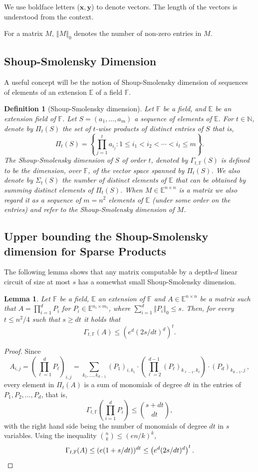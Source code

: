 \documentclass[10pt,a4paper]{article}
\newtheorem{lemma}[theorem]{Lemma}
\newtheorem{definition}[theorem]{Definition}
\newcommand{\F}{\mathbb F}
\newcommand{\E}{\mathbb E}
\newcommand{\N}{\mathbb N}
\newcommand{\vecx}{\mathbf x}
\newcommand{\vecy}{\mathbf y}
\newcommand{\inparen}[1]{\left(#1\right)}
\newcommand{\spars}[1]{\left\Vert#1\right\Vert_0}
\begin{document}
We use boldface letters ($\vecx,\vecy$) to denote vectors. The length of the vectors is understood from the context.

For a matrix $M$, $\spars{M}$ denotes the number of non-zero entries in $M$. 

\subsection{Shoup-Smolensky Dimension}
\label{sec:ssdim}
A useful concept will be the notion of Shoup-Smolensky dimension of sequences of elements of an extension $\E$ of a field $\F$. 
\begin{definition}[Shoup-Smolensky dimension]\label{def:SS-dim}
Let $\F$ be a field, and $\E$ be an extension field of $\F$. Let $S=(a_1,\ldots,a_m)$ a sequence of elements of $\E$. For $t\in\N$, denote by $\Pi_t(S)$ the set of $t$-wise products of distinct entries of $S$ that is,
\[\Pi_t(S)=\left\{\prod_{j=1}^t a_{i_j}:1\le i_1<i_2<\cdots<i_t\le m\right\}.\]
The Shoup-Smolensky dimension of $S$ of order $t$, denoted by $\Gamma_{t,\F}(S)$ is defined to be the dimension, over $\F$, of the vector space spanned by $\Pi_t(S)$.
We also denote by $\Sigma_t(S)$ the number of distinct elements of $\E$ that can be obtained by summing distinct elements of $\Pi_t(S)$.
When $M\in\E^{n\times n}$ is a matrix we also regard it as a sequence of $m=n^2$ elements of $\E$ (under some order on the entries) and refer to the Shoup-Smolensky dimension of $M$.
\end{definition}


\subsection{Upper bounding the Shoup-Smolensky dimension for Sparse Products}

\label{sec:SS-dim}
The following lemma shows that any matrix computable by a depth-$d$ linear circuit of size at most $s$ has a somewhat small Shoup-Smolensky dimension. 

\begin{lemma}\label{lem:ss-easy-ub-large-depth}
Let $\F$ be a field, $\E$ an extension of $\F$ and $A \in \E^{n \times n}$ be a matrix such that $A = \prod_{i = 1}^d P_i$ for $P_i \in \E^{n_i \times m_i}$, where $\sum_{i = 1}^d\spars{P_i} \leq s$. Then, for every $t\le n^2/4$ such that $s \ge dt$ it holds that
\[
\Gamma_{t, \F}(A) \le \inparen{e^d (2s/dt)^d}^t.
\]
\end{lemma}
\begin{proof}
Since 
$$A_{i,j} = \left(\prod_{\ell = 1}^d P_{\ell}\right)_{i,j} = \sum_{k_1, \ldots, k_{d-1}} (P_1)_{i, k_1}\cdot \left(\prod_{\ell = 2}^{d-1} (P_{\ell})_{k_{\ell-1}, k_{\ell}} \right) \cdot (P_{d})_{k_{d-1}, j}\, , $$
every element in $\Pi_{t} (A)$ is a sum of monomials of degree $dt$ in the entries of $P_1, P_2, \ldots, P_d$, that is,
\[
\Gamma_{t, \F}\left(\prod_{i = 1}^d P_i\right) \leq \binom{s + dt}{dt},
\]
with the right hand side being the number of monomials of degree $dt$ in $s$ variables.
Using the inequality $\binom{n}{k} \le (en/k)^k$,
\[
\Gamma_{t, \F}(A) \leq (e(1 + s/dt))^{dt} \le \inparen{e^d (2s/dt)^d}^t. \qedhere
\]
\end{proof}
\end{document}
